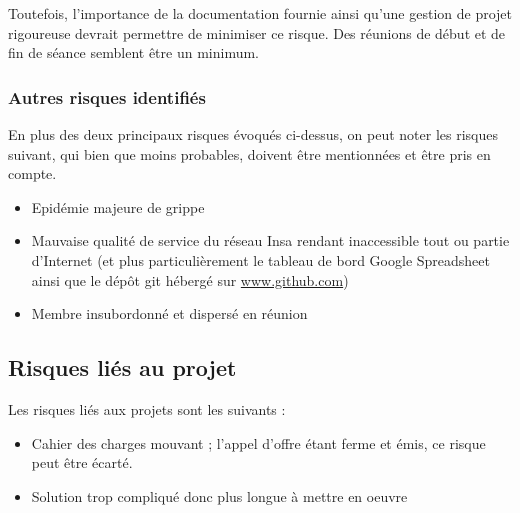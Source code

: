 Toutefois, l'importance de la documentation fournie ainsi qu'une gestion de
projet rigoureuse devrait permettre de minimiser ce risque. Des réunions de
début et de fin de séance semblent être un minimum.


\subsubsection{Autres risques identifiés}

En plus des deux principaux risques évoqués ci-dessus, on peut noter les
risques suivant, qui bien que moins probables, doivent être mentionnées et
être pris en compte.

\begin{itemize}

\item Epidémie majeure de grippe
\item Mauvaise qualité de service du réseau Insa rendant inaccessible tout
ou partie d'Internet (et plus particulièrement le tableau de bord Google
Spreadsheet ainsi que le dépôt git hébergé sur \url{www.github.com})
\item Membre insubordonné et dispersé en réunion

\end{itemize}

\subsection{Risques liés au projet}

Les risques liés aux projets sont les suivants :

\begin{itemize}

\item Cahier des charges mouvant ; l'appel d'offre étant ferme et émis, ce
risque peut être écarté.
\item Solution trop compliqué donc plus longue à mettre en oeuvre

\end{itemize}

\vfill
\pagebreak

